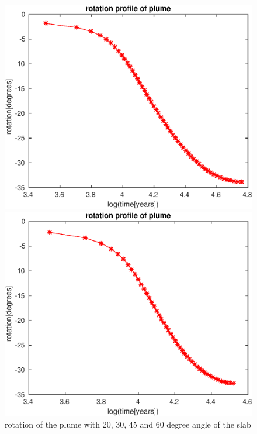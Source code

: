\documentclass[12pt]{scrartcl}
\begin{document}
\begin{figure}
\begin{minipage}[t]{1.0\textwidth}
\begin{minipage}[t]{0.5\textwidth}
		\end{minipage}
	\end{minipage}
	\begin{minipage}[t]{1.0\textwidth}	
		\begin{minipage}[t]{0.5\textwidth}
		\includegraphics[width=1.0\textwidth]{./Snapshots/ref/Subductionzonewithblobposrefslab45s2e7s2e7r20rotation.eps}
		\end{minipage}
		\begin{minipage}[t]{0.5\textwidth}
		\includegraphics[width=1.0\textwidth]{./Snapshots/ref/Subductionzonewithblobposrefslab60s2e7s2e7r20rotation.eps}
		\end{minipage}
	\end{minipage}
	\caption{rotation of the plume with 20, 30, 45 and 60 degree angle of the slab}
\end{figure}
\end{document}
